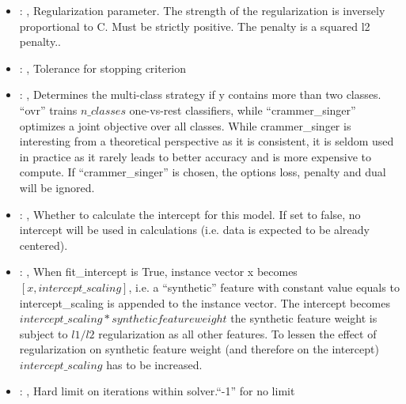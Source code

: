 \begin{itemize}
    \item {}: , 
      Regularization parameter. The strength of the regularization is inversely
      proportional to C.                                                            Must be strictly
      positive. The penalty is a squared l2 penalty..

    \item {}: , 
      Tolerance for stopping criterion

    \item {}: , 
      Determines the multi-class strategy if y contains more than two classes. ``ovr'' trains
      $n\_classes$ one-vs-rest classifiers, while ``crammer\_singer'' optimizes a joint objective over
      all classes.                                                  While crammer\_singer is
      interesting from a theoretical perspective as it is consistent, it is seldom used
      in practice as it rarely leads to better accuracy and is more expensive to compute. If
      ``crammer\_singer''                                                  is chosen, the options
      loss, penalty and dual will be ignored.

    \item {}: , 
      Whether to calculate the intercept for this model. If set to false, no
      intercept will be used in calculations (i.e. data is expected to be already centered).

    \item {}: , 
      When fit\_intercept is True, instance vector x becomes $[x, intercept\_scaling]$,
      i.e. a “synthetic” feature with constant value equals to intercept\_scaling is appended
      to the instance vector. The intercept becomes $intercept\_scaling * synthetic feature weight$
      \nb the synthetic feature weight is subject to $l1/l2$ regularization as all other features.
      To lessen the effect of regularization on synthetic feature weight (and therefore on the
      intercept)                                                  $intercept\_scaling$ has to be
      increased.

    \item {}: , 
      Hard limit on iterations within solver.``-1'' for no limit


\end{itemize}
